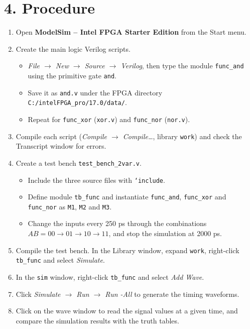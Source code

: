 \section*{4. Procedure}
\begin{enumerate}[leftmargin=*]
    \item Open \textbf{ModelSim -- Intel FPGA Starter Edition} from the Start menu.
    \item Create the main logic Verilog scripts.
    \begin{itemize}
        \item \textit{File $\rightarrow$ New $\rightarrow$ Source $\rightarrow$ Verilog}, then type the module \texttt{func\_and} using the primitive gate \texttt{and}.
        \item Save it as \texttt{and.v} under the FPGA directory \texttt{C:/intelFPGA\_pro/17.0/data/}.
        \item Repeat for \texttt{func\_xor} (\texttt{xor.v}) and \texttt{func\_nor} (\texttt{nor.v}).
    \end{itemize}
    \item Compile each script (\textit{Compile $\rightarrow$ Compile\ldots}, library \texttt{work}) and check the Transcript window for errors.
    \item Create a test bench \texttt{test\_bench\_2var.v}.
    \begin{itemize}
        \item Include the three source files with \texttt{`include}.
        \item Define module \texttt{tb\_func} and instantiate \texttt{func\_and}, \texttt{func\_xor} and \texttt{func\_nor} as \texttt{M1}, \texttt{M2} and \texttt{M3}.
        \item Change the inputs every 250 ps through the combinations $AB = 00 \rightarrow 01 \rightarrow 10 \rightarrow 11$, and stop the simulation at 2000 ps.
    \end{itemize}
    \item Compile the test bench. In the Library window, expand \texttt{work}, right-click \texttt{tb\_func} and select \textit{Simulate}.
    \item In the \texttt{sim} window, right-click \texttt{tb\_func} and select \textit{Add Wave}.
    \item Click \textit{Simulate $\rightarrow$ Run $\rightarrow$ Run -All} to generate the timing waveforms.
    \item Click on the wave window to read the signal values at a given time, and compare the simulation results with the truth tables.
\end{enumerate}

\newpage
